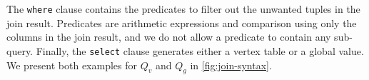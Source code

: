 \documentclass{sokendai_thesis} %
\begin{document}

The \texttt{where} clause contains the predicates to filter out the unwanted tuples in the join result.
Predicates are arithmetic expressions and comparison using only the columns in the join result, and we do not allow a predicate to contain any sub-query.
Finally, the \texttt{select} clause generates either a vertex table or a global value.
We present both examples for $Q_v$ and $Q_g$ in \autoref{fig:join-syntax}.
\end{document}
